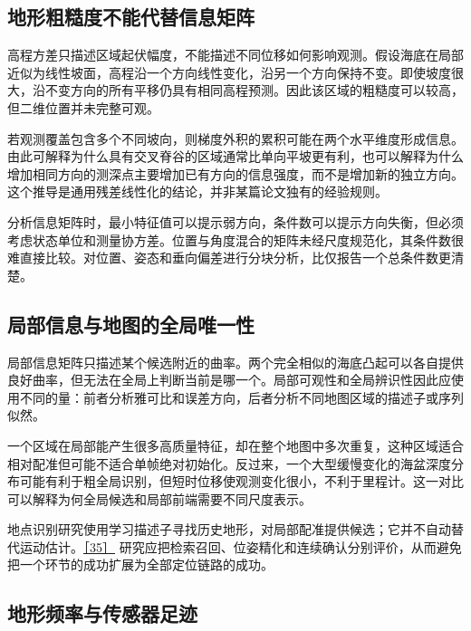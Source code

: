 \hypertarget{ux5730ux5f62ux7c97ux7cd9ux5ea6ux4e0dux80fdux4ee3ux66ffux4fe1ux606fux77e9ux9635}{%
\subsection{地形粗糙度不能代替信息矩阵}\label{ux5730ux5f62ux7c97ux7cd9ux5ea6ux4e0dux80fdux4ee3ux66ffux4fe1ux606fux77e9ux9635}}

高程方差只描述区域起伏幅度，不能描述不同位移如何影响观测。假设海底在局部近似为线性坡面，高程沿一个方向线性变化，沿另一个方向保持不变。即使坡度很大，沿不变方向的所有平移仍具有相同高程预测。因此该区域的粗糙度可以较高，但二维位置并未完整可观。

若观测覆盖包含多个不同坡向，则梯度外积的累积可能在两个水平维度形成信息。由此可解释为什么具有交叉脊谷的区域通常比单向平坡更有利，也可以解释为什么增加相同方向的测深点主要增加已有方向的信息强度，而不是增加新的独立方向。这个推导是通用残差线性化的结论，并非某篇论文独有的经验规则。

分析信息矩阵时，最小特征值可以提示弱方向，条件数可以提示方向失衡，但必须考虑状态单位和测量协方差。位置与角度混合的矩阵未经尺度规范化，其条件数很难直接比较。对位置、姿态和垂向偏差进行分块分析，比仅报告一个总条件数更清楚。

\hypertarget{ux5c40ux90e8ux4fe1ux606fux4e0eux5730ux56feux7684ux5168ux5c40ux552fux4e00ux6027}{%
\subsection{局部信息与地图的全局唯一性}\label{ux5c40ux90e8ux4fe1ux606fux4e0eux5730ux56feux7684ux5168ux5c40ux552fux4e00ux6027}}

局部信息矩阵只描述某个候选附近的曲率。两个完全相似的海底凸起可以各自提供良好曲率，但无法在全局上判断当前是哪一个。局部可观性和全局辨识性因此应使用不同的量：前者分析雅可比和误差方向，后者分析不同地图区域的描述子或序列似然。

一个区域在局部能产生很多高质量特征，却在整个地图中多次重复，这种区域适合相对配准但可能不适合单帧绝对初始化。反过来，一个大型缓慢变化的海盆深度分布可能有利于粗全局识别，但短时位移使观测变化很小，不利于里程计。这一对比可以解释为何全局候选和局部前端需要不同尺度表示。

地点识别研究使用学习描述子寻找历史地形，对局部配准提供候选；它并不自动替代运动估计。\href{https://arxiv.org/abs/2209.08578}{［35］} 研究应把检索召回、位姿精化和连续确认分别评价，从而避免把一个环节的成功扩展为全部定位链路的成功。

\hypertarget{ux5730ux5f62ux9891ux7387ux4e0eux4f20ux611fux5668ux8db3ux8ff9}{%
\subsection{地形频率与传感器足迹}\label{ux5730ux5f62ux9891ux7387ux4e0eux4f20ux611fux5668ux8db3ux8ff9}}

